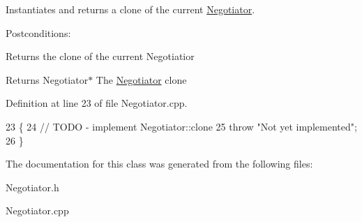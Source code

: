 Instantiates and returns a clone of the current \hyperlink{classNegotiator}{Negotiator}. 

Postconditions\+:
\begin{DoxyItemize}
\item Returns the clone of the current Negotiatior
\end{DoxyItemize}

\begin{DoxyReturn}{Returns}
Negotiator$\ast$ The \hyperlink{classNegotiator}{Negotiator} clone 
\end{DoxyReturn}


Definition at line 23 of file Negotiator.\+cpp.


\begin{DoxyCode}
23                               \{
24     \textcolor{comment}{// TODO - implement Negotiator::clone}
25     \textcolor{keywordflow}{throw} \textcolor{stringliteral}{"Not yet implemented"};
26 \}
\end{DoxyCode}


The documentation for this class was generated from the following files\+:\begin{DoxyCompactItemize}
\item 
Negotiator.\+h\item 
Negotiator.\+cpp\end{DoxyCompactItemize}

